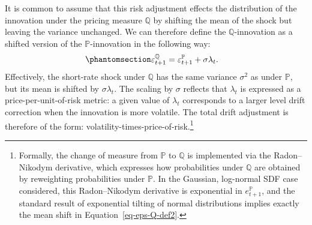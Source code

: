 \documentclass[
  letterpaper,
  DIV=11,
  numbers=noendperiod]{scrreprt}
\begin{document}
It is common to assume that this risk adjustment effects the
distribution of the innovation under the pricing measure \(\mathbb{Q}\)
by shifting the mean of the shock but leaving the variance unchanged. We
can therefore define the \(\mathbb{Q}\)-innovation as a shifted version
of the \(\mathbb{P}\)-innovation in the following way:
\begin{equation}\protect\phantomsection\label{eq-eps-Q-def2}{
\begin{align}
    \varepsilon_{t+1}^{\mathbb{Q}}
    &= \varepsilon_{t+1}^{\mathbb{P}} + \sigma \lambda_t.
\end{align}
}\end{equation} Effectively, the short-rate shock under \(\mathbb{Q}\)
has the same variance \(\sigma^2\) as under \(\mathbb{P}\), but its mean
is shifted by \(\sigma \lambda_t\). The scaling by \(\sigma\) reflects
that \(\lambda_t\) is expressed as a price-per-unit-of-risk metric: a
given value of \(\lambda_t\) corresponds to a larger level drift
correction when the innovation is more volatile. The total drift
adjustment is therefore of the form:
volatility-times-price-of-risk.\footnote{Formally, the change of measure
  from \(\mathbb{P}\) to \(\mathbb{Q}\) is implemented via the
  Radon--Nikodym derivative, which expresses how probabilities under
  \(\mathbb{Q}\) are obtained by reweighting probabilities under
  \(\mathbb{P}\). In the Gaussian, log-normal SDF case considered, this
  Radon--Nikodym derivative is exponential in \(e_{t+1}^{\mathbb{P}}\),
  and the standard result of exponential tilting of normal distributions
  implies exactly the mean shift in Equation~\ref{eq-eps-Q-def2}.}
\end{document}
